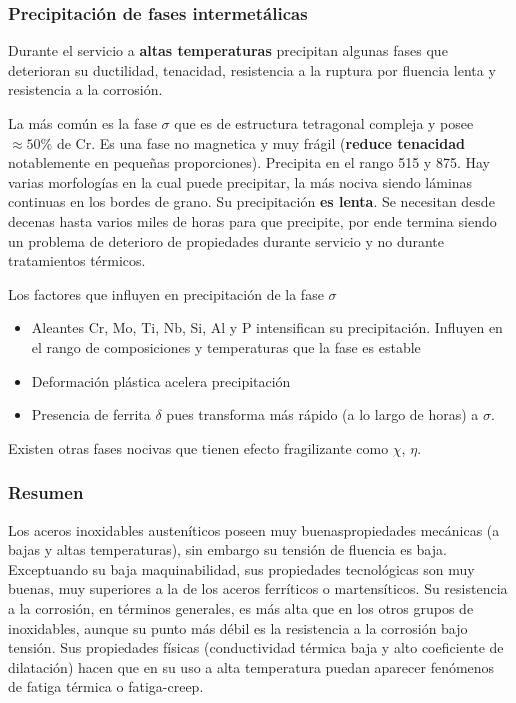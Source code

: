 \subsubsection{Precipitación de fases intermetálicas}
Durante el servicio a \textbf{altas temperaturas} precipitan algunas fases que deterioran su ductilidad, tenacidad, resistencia a la ruptura por fluencia lenta y resistencia a la corrosión.

La más común es la fase $\sigma$ que es de estructura tetragonal compleja y posee $\approx 50\%$ de Cr. Es una fase no magnetica y muy frágil (\textbf{reduce tenacidad} notablemente en pequeñas proporciones). Precipita en el rango 515 y 875\grad. Hay varias morfologías en la cual puede precipitar, la más nociva siendo láminas continuas en los bordes de grano. Su precipitación \textbf{es lenta}. Se necesitan desde decenas hasta varios miles de horas para que precipite, por ende termina siendo un problema de deterioro de propiedades durante servicio y no durante tratamientos térmicos.


Los factores que influyen en precipitación de la fase $\sigma$
\begin{itemize}
	\item Aleantes Cr, Mo, Ti, Nb, Si, Al y P intensifican su precipitación. Influyen en el rango de composiciones y temperaturas que la fase es estable
	\item Deformación plástica acelera precipitación
	\item Presencia de ferrita $\delta$ pues transforma más rápido (a lo largo de horas) a $\sigma$.
\end{itemize}

Existen otras fases nocivas que tienen efecto fragilizante como $\chi$, $\eta$.

\subsubsection{Resumen}
Los aceros inoxidables austeníticos poseen muy buenaspropiedades mecánicas (a bajas y altas temperaturas), sin embargo su tensión de fluencia es baja. Exceptuando su baja maquinabilidad, sus propiedades tecnológicas son muy buenas, muy superiores a la de los aceros ferríticos o martensíticos. Su resistencia a la corrosión, en términos generales, es más alta que en los otros grupos de inoxidables, aunque su punto más débil es la resistencia a la corrosión bajo tensión. Sus propiedades físicas (conductividad térmica baja y alto coeficiente de dilatación) hacen que en su uso a alta temperatura puedan aparecer fenómenos de fatiga térmica o fatiga-creep.

